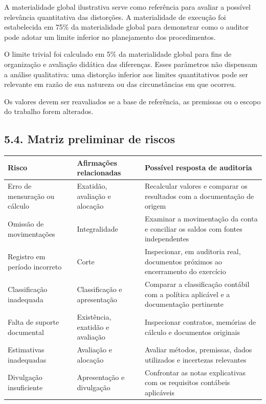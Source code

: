 \documentclass[
]{article}
\newcounter{none} %
\begin{document}
A materialidade global ilustrativa serve como referência para avaliar a
possível relevância quantitativa das distorções. A materialidade de
execução foi estabelecida em 75\% da materialidade global para
demonstrar como o auditor pode adotar um limite inferior no planejamento
dos procedimentos.

O limite trivial foi calculado em 5\% da materialidade global para fins
de organização e avaliação didática das diferenças. Esses parâmetros não
dispensam a análise qualitativa: uma distorção inferior aos limites
quantitativos pode ser relevante em razão de sua natureza ou das
circunstâncias em que ocorreu.

Os valores devem ser reavaliados se a base de referência, as premissas
ou o escopo do trabalho forem alterados.

\subsection{5.4. Matriz preliminar de
riscos}\label{matriz-preliminar-de-riscos}

{\def\LTcaptype{none} %
\begin{longtable}[]{@{}
  >{\raggedright\arraybackslash}p{}
  >{\raggedright\arraybackslash}p{}
  >{\raggedright\arraybackslash}p{}@{}}
\toprule\noalign{}
\begin{minipage}[b]{\linewidth}\raggedright
Risco
\end{minipage} & \begin{minipage}[b]{\linewidth}\raggedright
Afirmações relacionadas
\end{minipage} & \begin{minipage}[b]{\linewidth}\raggedright
Possível resposta de auditoria
\end{minipage} \\
\midrule\noalign{}
\endhead
\bottomrule\noalign{}
\endlastfoot
Erro de mensuração ou cálculo & Exatidão, avaliação e alocação &
Recalcular valores e comparar os resultados com a documentação de
origem \\
Omissão de movimentações & Integralidade & Examinar a movimentação da
conta e conciliar os saldos com fontes independentes \\
Registro em período incorreto & Corte & Inspecionar, em auditoria real,
documentos próximos ao encerramento do exercício \\
Classificação inadequada & Classificação e apresentação & Comparar a
classificação contábil com a política aplicável e a documentação
pertinente \\
Falta de suporte documental & Existência, exatidão e avaliação &
Inspecionar contratos, memórias de cálculo e documentos originais \\
Estimativas inadequadas & Avaliação e alocação & Avaliar métodos,
premissas, dados utilizados e incertezas relevantes \\
Divulgação insuficiente & Apresentação e divulgação & Confrontar as
notas explicativas com os requisitos contábeis aplicáveis \\
\end{longtable}
}
\end{document}

